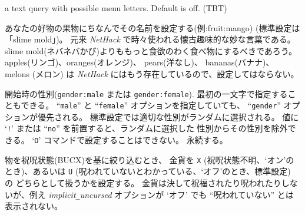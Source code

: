 a text query with possible menu letters. Default is off.
(TBT)
\item[\ib{fruit}]
あなたの好物の果物にちなんでその名前を設定する(例:fruit:mango)
(標準設定は「slime mold」)。
元来 {\it NetHack\/} で時々使われる懐古趣味的な妙な言葉である。
slime mold(ネバネバかび)よりももっと食欲のわく食べ物にするべきであろう。
apples(リンゴ)、oranges(オレンジ)、 pears(洋なし)、 bananas(バナナ)、
melons (メロン) は {\it NetHack\/} にはもう存在しているので、設定してはならない。
\item[\ib{gender}]
開始時の性別({\tt gender:male} または {\tt gender:female}).
最初の一文字で指定することもできる。
``{\tt male}'' と ``{\tt female}'' オプションを指定していても、
``{\tt gender}'' オプションが優先される。
標準設定では適切な性別がランダムに選択される。
値に `{\tt !}' または ``{\tt no}'' を前置すると、ランダムに選択した
性別からその性別を除外できる。
`{\tt O}' コマンドで設定することはできない。
永続する。
\item[\ib{goldX}]
物を祝呪状態(BUCX)を基に絞り込むとき、
金貨を
{\tt X} (祝呪状態不明、`オン'のとき)、あるいは
{\tt U} (呪われていないとわかっている、`オフ'のとき、標準設定) の
どちらとして扱うかを設定する。
金貨は決して祝福されたり呪われたりしないが、例え
{\it implicit\verb+_+uncursed\/} オプションが `オフ' でも
``呪われていない'' とは表示されない。
\item[\ib{help}]
